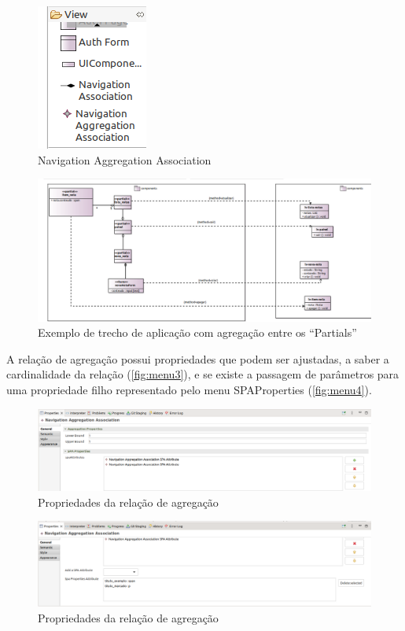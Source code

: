 \documentclass[
article,			%
11pt,				%
oneside,			%
a4paper,			%
english,			%
brazil,				%
sumario=tradicional
]{abntex2}
\begin{document}
\begin{figure}
	\centering
	\includegraphics[width=0.3\linewidth]{figuras/menu2}
	\caption{Navigation Aggregation Association}
	\label{fig:menu2}
\end{figure}

\begin{figure}
	\centering
	\includegraphics[width=0.7\linewidth]{figuras/Partial3}
	\caption{Exemplo de trecho de aplicação com agregação entre os ``Partials''}
	\label{fig:partial3}
\end{figure}

A relação de agregação possui propriedades que podem ser ajustadas, a saber a cardinalidade da relação (\autoref{fig:menu3}), e se existe a passagem de parâmetros para uma propriedade filho representado pelo menu SPAProperties (\autoref{fig:menu4}).

\begin{figure}
	\centering
	\includegraphics[width=0.7\linewidth]{figuras/menu3}
	\caption{Propriedades da relação de agregação}
	\label{fig:menu3}
\end{figure}

\begin{figure}
	\centering
	\includegraphics[width=0.7\linewidth]{figuras/menu4}
	\caption{Propriedades da relação de agregação}
	\label{fig:menu4}
\end{figure}
\end{document}
